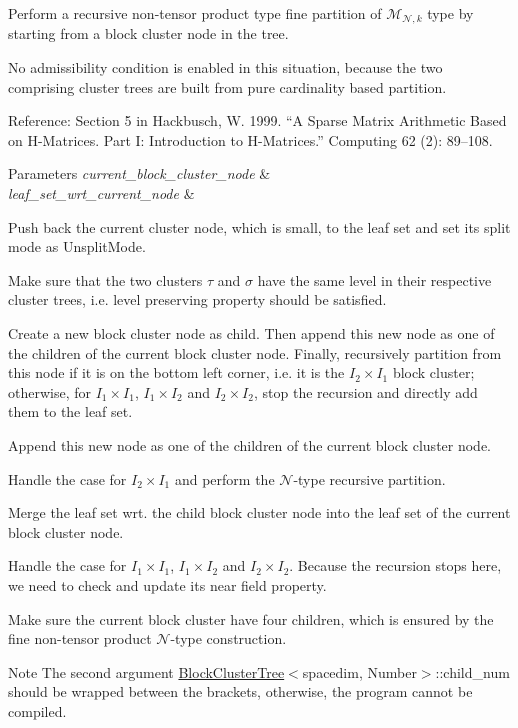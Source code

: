 Perform a recursive non-\/tensor product type fine partition of $\mathcal{M}_{\mathcal{N},k}$ type by starting from a block cluster node in the tree.

No admissibility condition is enabled in this situation, because the two comprising cluster trees are built from pure cardinality based partition.

Reference\+: Section 5 in Hackbusch, W. 1999. “A Sparse Matrix Arithmetic Based on H-\/\+Matrices. Part I\+: Introduction to H-\/\+Matrices.” Computing 62 (2)\+: 89–108. 
\begin{DoxyParams}{Parameters}
{\em current\+\_\+block\+\_\+cluster\+\_\+node} & \\
\hline
{\em leaf\+\_\+set\+\_\+wrt\+\_\+current\+\_\+node} & \\
\hline
\end{DoxyParams}
Push back the current cluster node, which is small, to the leaf set and set its split mode as {\ttfamily Unsplit\+Mode}.

Make sure that the two clusters $\tau$ and $\sigma$ have the same level in their respective cluster trees, i.\+e. level preserving property should be satisfied.

Create a new block cluster node as child. Then append this new node as one of the children of the current block cluster node. Finally, recursively partition from this node if it is on the bottom left corner, i.\+e. it is the $I_2 \times I_1$ block cluster; otherwise, for $I_1 \times I_1$, $I_1 \times I_2$ and $I_2 \times I_2$, stop the recursion and directly add them to the leaf set.

Append this new node as one of the children of the current block cluster node.

Handle the case for $I_2 \times I_1$ and perform the $\mathcal{N}$-\/type recursive partition.

Merge the leaf set wrt. the child block cluster node into the leaf set of the current block cluster node.

Handle the case for $I_1 \times I_1$, $I_1 \times I_2$ and $I_2 \times I_2$. Because the recursion stops here, we need to check and update its near field property.

Make sure the current block cluster have four children, which is ensured by the fine non-\/tensor product $\mathcal{N}$-\/type construction.


\begin{DoxyDescription}
\item[Note ]The second argument {\ttfamily \hyperlink{classBlockClusterTree}{Block\+Cluster\+Tree}$<$spacedim}, Number$>$\+::child\+\_\+num should be wrapped between the brackets, otherwise, the program cannot be compiled. 
\end{DoxyDescription}

